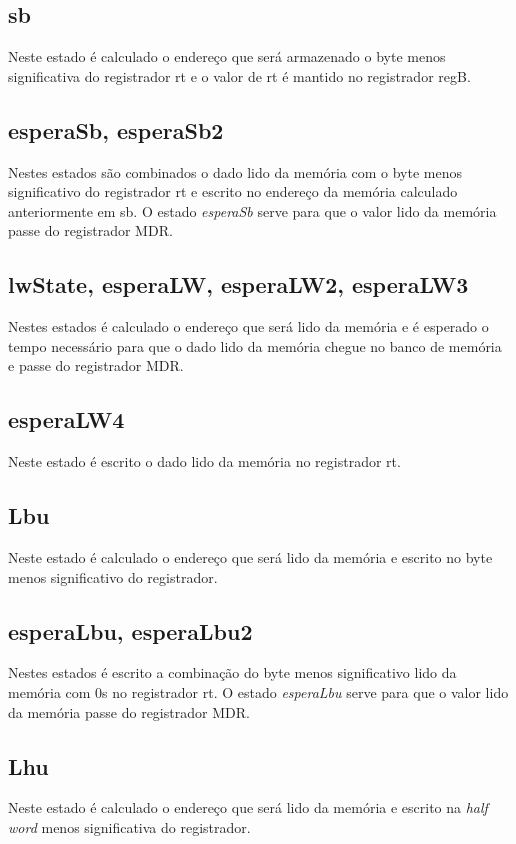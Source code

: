 \documentclass{article}
\begin{document}
    \subsection{sb}
    Neste estado é calculado o endereço que será armazenado o byte menos significativa do registrador rt e o valor de rt é mantido no registrador regB.
    
    \subsection{esperaSb, esperaSb2}
    Nestes estados são combinados o dado lido da memória com o byte menos significativo do registrador rt e escrito no endereço da memória calculado anteriormente em sb. O estado {\it esperaSb} serve para que o valor lido da memória passe do registrador MDR.
    
    \subsection{lwState, esperaLW, esperaLW2, esperaLW3}
    Nestes estados é calculado o endereço que será lido da memória e é esperado o tempo necessário para que o dado lido da memória chegue no banco de memória e passe do registrador MDR.
    
    \subsection{esperaLW4}
    Neste estado é escrito o dado lido da memória no registrador rt.
    
    \subsection{Lbu}
    Neste estado é calculado o endereço que será lido da memória e escrito no byte menos significativo do registrador.
    
    \subsection{esperaLbu, esperaLbu2}
    Nestes estados é escrito a combinação do byte menos significativo lido da memória com 0s no registrador rt. O estado {\it esperaLbu} serve para que o valor lido da memória passe do registrador MDR.
    
    \subsection{Lhu}
    Neste estado é calculado o endereço que será lido da memória e escrito na {\it half word} menos significativa do registrador.
    
\end{document}
